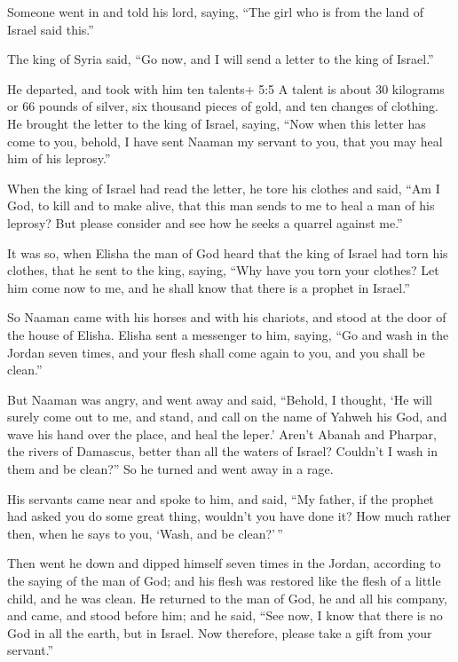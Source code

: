 Someone went in and told his lord, saying, ``The girl who
is from the land of Israel said this.''

 The king of Syria said, ``Go now, and I will send a letter
to the king of Israel.''

He departed, and took with him ten talents+ 5:5 A talent is about 30
kilograms or 66 pounds of silver, six thousand pieces of gold, and ten
changes of clothing.  He brought the letter to the king of
Israel, saying, ``Now when this letter has come to you, behold, I have
sent Naaman my servant to you, that you may heal him of his leprosy.''

 When the king of Israel had read the letter, he tore his
clothes and said, ``Am I God, to kill and to make alive, that this man
sends to me to heal a man of his leprosy? But please consider and see
how he seeks a quarrel against me.''

 It was so, when Elisha the man of God heard that the king
of Israel had torn his clothes, that he sent to the king, saying, ``Why
have you torn your clothes? Let him come now to me, and he shall know
that there is a prophet in Israel.''

 So Naaman came with his horses and with his chariots, and
stood at the door of the house of Elisha.  Elisha sent a
messenger to him, saying, ``Go and wash in the Jordan seven times, and
your flesh shall come again to you, and you shall be clean.''

 But Naaman was angry, and went away and said, ``Behold, I
thought, `He will surely come out to me, and stand, and call on the name
of Yahweh his God, and wave his hand over the place, and heal the
leper.'  Aren't Abanah and Pharpar, the rivers of Damascus,
better than all the waters of Israel? Couldn't I wash in them and be
clean?'' So he turned and went away in a rage.

 His servants came near and spoke to him, and said, ``My
father, if the prophet had asked you do some great thing, wouldn't you
have done it? How much rather then, when he says to you, `Wash, and be
clean?'\,''

 Then went he down and dipped himself seven times in the
Jordan, according to the saying of the man of God; and his flesh was
restored like the flesh of a little child, and he was clean.
 He returned to the man of God, he and all his company, and
came, and stood before him; and he said, ``See now, I know that there is
no God in all the earth, but in Israel. Now therefore, please take a
gift from your servant.''

